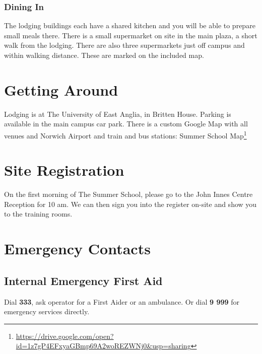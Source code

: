 \documentclass[12pt,]{book}
\let\rmarkdownfootnote\footnote%
\def\footnote{\protect\rmarkdownfootnote}
\renewcommand{\href}[2]{#2\footnote{\url{#1}}}
\begin{document}
\subsubsection*{Dining In}\label{dining-in}

The lodging buildings each have a shared kitchen and you will be able to
prepare small meals there. There is a small supermarket on site in the
main plaza, a short walk from the lodging. There are also three
supermarkets just off campus and within walking distance. These are
marked on the included map.

\section*{Getting Around}\label{getting-around}

Lodging is at The University of East Anglia, in Britten House. Parking
is available in the main campus car park. There is a custom Google Map
with all venues and Norwich Airport and train and bus stations:
\href{https://drive.google.com/open?id=1z7gP4EFxyaGBmp69A2woREZWNj0\&usp=sharing}{Summer
School Map}

\section*{Site Registration}\label{site-registration}

On the first morning of The Summer School, please go to the John Innes
Centre Reception for 10 am. We can then sign you into the register
on-site and show you to the training rooms.

\section*{Emergency Contacts}\label{emergency-contacts}

\subsection*{Internal Emergency First
Aid}\label{internal-emergency-first-aid}

Dial \textbf{333}, ask operator for a First Aider or an ambulance. Or
dial \textbf{9 999} for emergency services directly.
\end{document}

